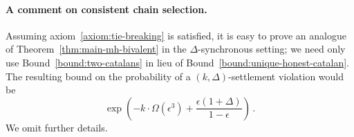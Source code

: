     \paragraph{A comment on consistent chain selection.} 
    Assuming axiom~\ref{axiom:tie-breaking} is satisfied, 
    it is easy to prove an analogue of Theorem~\ref{thm:main-mh-bivalent} 
    in the $\Delta$-synchronous setting; 
    we need only use Bound~\ref{bound:two-catalans} 
    in lieu of Bound~\ref{bound:unique-honest-catalan}. 
    The resulting bound on the probability of a $(k, \Delta)$-settlement violation would be 
    $$
      \exp\left( 
        -k\cdot \Omega(\epsilon^3) 
        + 
        \frac{\epsilon(1+\Delta)}{1 - \epsilon} 
      \right)
      \,.
    $$
    We omit further details.


